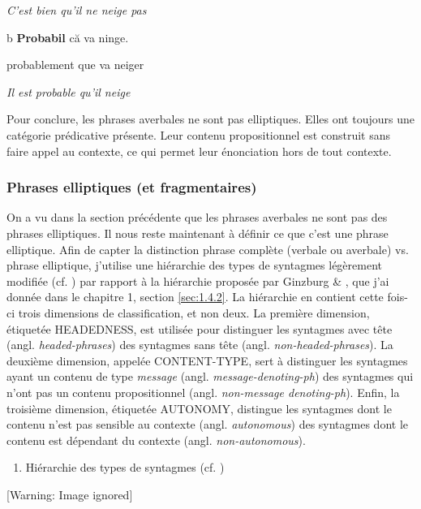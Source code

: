 \textit{  C'est bien qu'il ne neige pas}  

  b  \textbf{Probabil} că va ninge.

    probablement que va neiger

    \textit{Il est probable qu'il neige} 

Pour conclure, les phrases averbales ne sont pas elliptiques. Elles ont toujours une catégorie prédicative présente. Leur contenu propositionnel est construit sans faire appel au contexte, ce qui permet leur énonciation hors de tout contexte. 

\subsubsection{Phrases elliptiques (et fragmentaires)}
\label{bkm:Ref306038431}On a vu dans la section précédente que les phrases averbales ne sont pas des phrases elliptiques. Il nous reste maintenant à définir ce que c'est une phrase elliptique. Afin de capter la distinction phrase complète (verbale ou averbale) vs. phrase elliptique, j'utilise une hiérarchie des types de syntagmes légèrement modifiée (cf. \citet{Laurens2008}) par rapport à la hiérarchie proposée par Ginzburg \& \citet{Sag2000}, que j'ai donnée dans le chapitre 1, section \ref{sec:1.4.2}. La hiérarchie en  contient cette fois-ci trois dimensions de classification, et non deux. La première dimension, étiquetée HEADEDNESS, est utilisée pour distinguer les syntagmes avec tête (angl. \textit{headed-phrases}) des syntagmes sans tête (angl. \textit{non-headed-phrases}). La deuxième dimension, appelée CONTENT-TYPE, sert à distinguer les syntagmes ayant un contenu de type \textit{message} (angl. \textit{message-denoting-ph}) des syntagmes qui n'ont pas un contenu propositionnel (angl. \textit{non-message denoting-ph}). Enfin, la troisième dimension, étiquetée AUTONOMY, distingue les syntagmes dont le contenu n'est pas sensible au contexte (angl. \textit{autonomous}) des syntagmes dont le contenu est dépendant du contexte (angl. \textit{non-autonomous}). 


\begin{enumerate}
\item \label{bkm:Ref302663728}Hiérarchie des types de syntagmes (cf. \citet{Laurens2008})


\end{enumerate}
{   [Warning: Image ignored] %
} 

